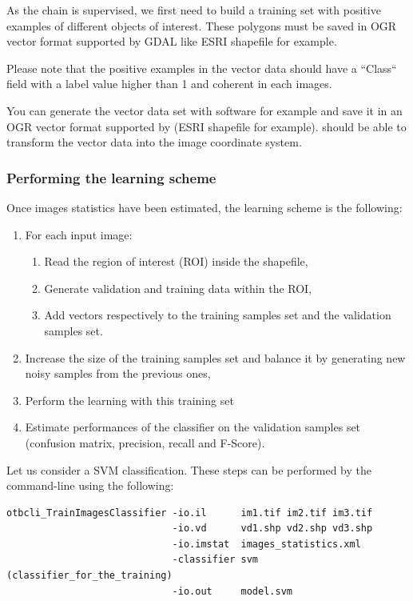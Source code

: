 As the chain is supervised, we first need to build a training set with
positive examples of different objects of interest. These polygons
must be saved in OGR vector format supported by GDAL like ESRI
shapefile for example.

Please note that the positive examples in the vector data should have a ``Class``
field with a label value higher than 1 and coherent in each images.

You can generate the vector data set with \qgis software for
example and save it in an OGR vector format supported by \gdal (ESRI
shapefile for example). \app should be able to transform the
vector data into the image coordinate system.

\subsubsection{Performing the learning scheme}

Once images statistics have been estimated, the learning scheme is the following:
\begin{enumerate}
  \item For each input image:
  \begin{enumerate}
    \item Read the region of interest (ROI) inside the shapefile,
    \item Generate validation and training data within the ROI,
    \item Add vectors respectively to the training samples set and the validation
    samples set.
  \end{enumerate}
  \item Increase the size of the training samples set and balance it by
  generating new noisy samples from the previous ones,
  \item Perform the learning with this training set
  \item Estimate performances of the classifier on the validation samples set
  (confusion matrix, precision, recall and F-Score).
\end{enumerate}

Let us consider a SVM classification. These steps can be performed by the 
 command-line using the following:

\begin{verbatim}
otbcli_TrainImagesClassifier -io.il      im1.tif im2.tif im3.tif
                             -io.vd      vd1.shp vd2.shp vd3.shp
                             -io.imstat  images_statistics.xml
                             -classifier svm (classifier_for_the_training)
                             -io.out     model.svm
\end{verbatim}

